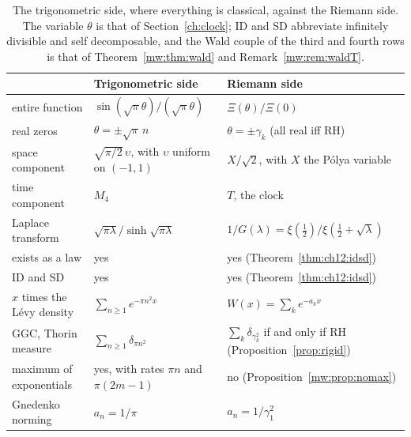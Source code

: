 \begin{table}[htbp]
\centering\small
\begin{tabular}{p{}p{}p{}}
\toprule
 & Trigonometric side & Riemann side\\
\midrule
entire function & $\sin(\sqrt\pi\theta)/(\sqrt\pi\theta)$ & $\Xi(\theta)/\Xi(0)$\\
real zeros & $\theta=\pm\sqrt\pi\,n$ & \raggedright $\theta=\pm\gamma_k$ (all real iff RH)\tabularnewline
space component & \raggedright $\sqrt{\pi/2}\,\upsilon$, with $\upsilon$ uniform on $(-1,1)$ & \raggedright $X/\sqrt2$, with $X$ the P\'olya variable\tabularnewline
time component & $M_4$ & $T$, the clock\\
Laplace transform & \raggedright $\sqrt{\pi\lambda}/\sinh\sqrt{\pi\lambda}$ & \raggedright $1/G(\lambda)=\xi(\frac12)/\xi(\frac12+\sqrt\lambda)$\tabularnewline
exists as a law & yes & yes (Theorem~\ref{thm:ch12:idsd})\\
ID and SD & yes & yes (Theorem~\ref{thm:ch12:idsd})\\
\raggedright $x$ times the L\'evy density & $\sum_{n\ge1}e^{-\pi n^2x}$ & $W(x)=\sum_ke^{-a_kx}$\\
GGC, Thorin measure & $\sum_{n\ge1}\delta_{\pi n^2}$ & \raggedright $\sum_k\delta_{\gamma_k^2}$ if and only if RH (Proposition~\ref{prop:rigid})\tabularnewline
\raggedright maximum of exponentials & \raggedright yes, with rates $\pi n$ and $\pi(2m-1)$ & no (Proposition~\ref{mw:prop:nomax})\\
Gnedenko norming & $a_n=1/\pi$ & $a_n=1/\gamma_1^2$\\
\bottomrule
\end{tabular}
\caption{The trigonometric side, where everything is classical, against the Riemann side. The variable $\theta$ is that of Section~\ref{ch:clock}; ID and SD abbreviate infinitely divisible and self decomposable, and the Wald couple of the third and fourth rows is that of Theorem~\ref{mw:thm:wald} and Remark~\ref{mw:rem:waldT}.}
\label{mw:tab:dict}
\end{table}

